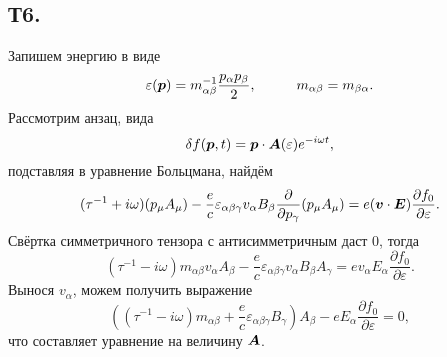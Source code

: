 \subsection*{Т6. }

Запишем энергию в виде
\begin{equation*}
	\varepsilon(\vc{p}) = m_{\alpha \beta}^{-1} \frac{p_\alpha p_\beta}{2},
	\hspace{10 mm} 
	m_{\alpha \beta} = m_{\beta \alpha}.
\end{equation*}
Рассмотрим анзац, вида
\begin{equation*}
	\delta f(\boldsymbol{p}, t) = \boldsymbol{p} \cdot \boldsymbol{A}(\varepsilon) e^{- i \omega t},
\end{equation*}
подставляя в уравнение Больцмана, найдём
\begin{equation*}
	(\tau^{-1} + i \omega) (p_\mu A_\mu) - \frac{e}{c} \varepsilon_{\alpha \beta \gamma} v_\alpha B_\beta \frac{\partial }{\partial p_\gamma}  (p_\mu A_\mu) = e (\boldsymbol{v} \cdot \boldsymbol{E}) \frac{\partial f_0}{\partial \varepsilon}.
\end{equation*}
Свёртка симметричного тензора с антисимметричным даст 0, тогда
\begin{equation*}
	(\tau^{-1} - i \omega) m_{\alpha \beta} v_\alpha A_\beta - \frac{e}{c} \varepsilon_{\alpha \beta \gamma} v_\alpha B_{\beta} A_\gamma = e v_\alpha E_\alpha \frac{\partial f_0}{\partial \varepsilon}.
\end{equation*}
Вынося $v_\alpha$, можем получить выражение
\begin{equation*}
	\left(
		(\tau^{-1} - i \omega) m_{\alpha \beta} + \frac{e}{c} \varepsilon_{\alpha \beta \gamma} B_\gamma
	\right) A_\beta - e E_\alpha \frac{\partial f_0}{\partial \varepsilon} = 0,
\end{equation*}
что составляет уравнение на величину $\boldsymbol{A}$. 


